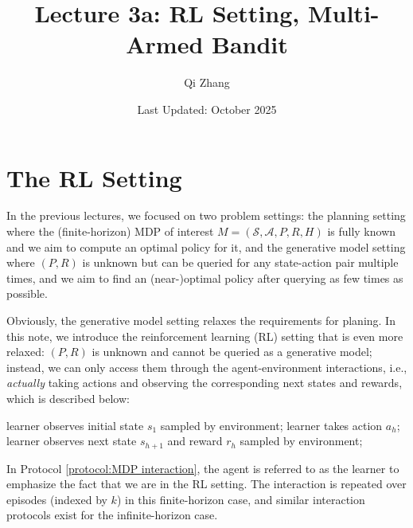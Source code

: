 \newcommand{\Regret}{\operatorname{Regret}}


\title{Lecture 3a: RL Setting, Multi-Armed Bandit}
\author{Qi Zhang}
\date{Last Updated: October 2025}

\section{The RL Setting}
In the previous lectures, we focused on two problem settings:
the planning setting where the (finite-horizon) MDP of interest $M=(\mathcal{S},\mathcal{A}, P, R, H)$ is fully known and we aim to compute an optimal policy for it,
and the generative model setting where $(P,R)$ is unknown but can be queried for any state-action pair multiple times, and we aim to find an (near-)optimal policy after querying as few times as possible.

Obviously, the generative model setting relaxes the requirements for planing. 
In this note, we introduce the reinforcement learning (RL) setting that is even more relaxed:
$(P,R)$ is unknown and cannot be queried as a generative model; instead, we can only access them through the agent-environment interactions, i.e., {\em actually} taking actions and observing the corresponding next states and rewards, which is described below:
\begin{protocol}
\caption{MDP interaction (finite-horizon)} \label{protocol:MDP interaction}
\begin{algorithmic}[1]
    \State learner observes  initial state $s_1$ sampled by environment; 
        \State learner takes action $a_h$;  \label{protocol:MDP interaction:line:RL algorithm}
        \State learner observes next state $s_{h+1}$ and reward $r_h$ sampled by environment;
    \EndFor
\EndFor
\end{algorithmic}
\end{protocol}

In Protocol \ref{protocol:MDP interaction}, the agent is referred to as the learner to emphasize the fact that we are in the RL setting.
The interaction is repeated over episodes (indexed by $k$) in this finite-horizon case, and similar interaction protocols exist for the infinite-horizon case.

